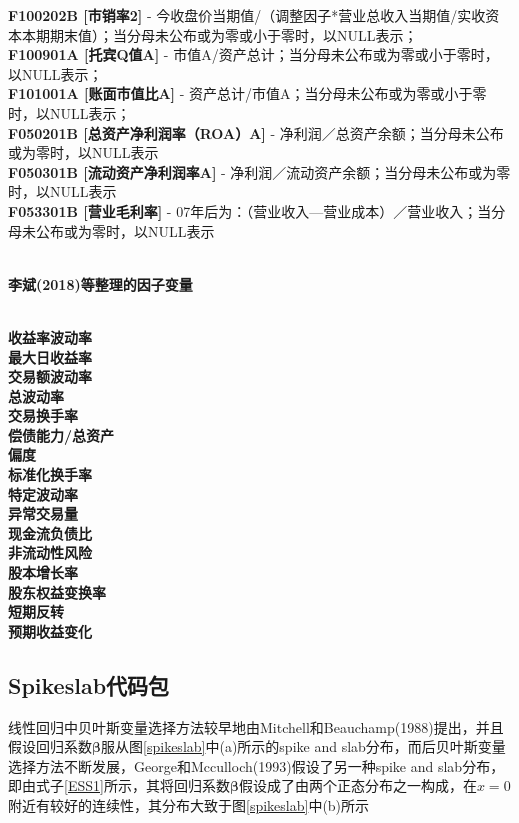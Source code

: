 \documentclass[12pt]{article} %
\begin{document}
	\textbf{F100202B [市销率2]} - 今收盘价当期值/（调整因子*营业总收入当期值/实收资本本期期末值）；当分母未公布或为零或小于零时，以NULL表示；
\\
	\textbf{F100901A [托宾Q值A] }- 市值A/资产总计；当分母未公布或为零或小于零时，以NULL表示；
\\
	\textbf{F101001A [账面市值比A]} - 资产总计/市值A；当分母未公布或为零或小于零时，以NULL表示；\\
	\textbf{F050201B [总资产净利润率（ROA）A]} - 净利润／总资产余额；当分母未公布或为零时，以NULL表示
\\
	\textbf{F050301B [流动资产净利润率A]} - 净利润／流动资产余额；当分母未公布或为零时，以NULL表示
\\
	\textbf{F053301B [营业毛利率]} - 07年后为：（营业收入—营业成本）／营业收入；当分母未公布或为零时，以NULL表示 \\ \\
	\begin{large}
		\textbf{李斌(2018)等整理的因子变量}
	\end{large} \\
	\textbf{收益率波动率} \\
	\textbf{最大日收益率} \\
	\textbf{交易额波动率} \\
	\textbf{总波动率} \\
	\textbf{交易换手率} \\
	\textbf{偿债能力/总资产} \\
	\textbf{偏度} \\
	\textbf{标准化换手率} \\
	\textbf{特定波动率} \\
	\textbf{异常交易量} \\
	\textbf{现金流负债比} \\
	\textbf{非流动性风险} \\
	\textbf{股本增长率} \\
	\textbf{股东权益变换率} \\
	\textbf{短期反转} \\
	\textbf{预期收益变化}
	
	
	\newpage
	\subsection{Spikeslab代码包}
	线性回归中贝叶斯变量选择方法较早地由Mitchell和Beauchamp(1988)提出\cite{mitchell1988bayesian}，并且假设回归系数$\boldsymbol{\beta}$服从图\ref{spikeslab}中(a)所示的spike and slab分布，而后贝叶斯变量选择方法不断发展，George和Mcculloch(1993)假设了另一种spike and slab分布\cite{george1993variable}，即由式子\eqref{ESS1}所示，其将回归系数$\boldsymbol{\beta}$假设成了由两个正态分布之一构成，在$x=0$附近有较好的连续性，其分布大致于图\ref{spikeslab}中(b)所示
	
\end{document}

